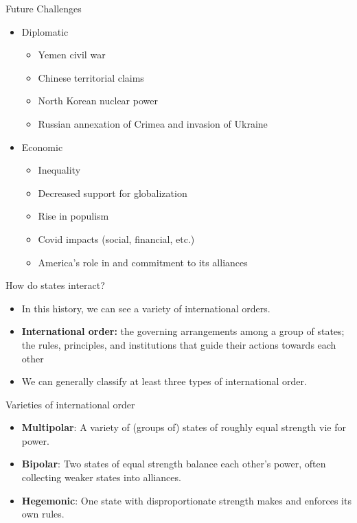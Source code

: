 \documentclass[handout]{beamer}
\begin{document}
\begin{frame}{\LARGE Future Challenges}
	\begin{itemize}
		\item Diplomatic
		\begin{itemize}
			\item Yemen civil war
			\item Chinese territorial claims
			\item North Korean nuclear power
			\item Russian annexation of Crimea and invasion of Ukraine \pause
		\end{itemize}
	\end{itemize}
	\begin{itemize}
		\item Economic
		\begin{itemize}
			\item Inequality
			\item Decreased support for globalization
			\item Rise in populism
			\item Covid impacts (social, financial, etc.)
			\item America's role in and commitment to its alliances			
		\end{itemize}
	\end{itemize}
\end{frame}

\begin{frame}{\LARGE How do states interact?}
\begin{itemize} 
	\item In this history, we can see a variety of international orders. \pause
    \item \textbf{International order:} the governing arrangements among a group of states; the rules, principles, and institutions that guide their actions towards each other \pause
    \item We can generally classify at least three types of international order.
\end{itemize}
\end{frame}

\begin{frame}{\LARGE Varieties of international order}
\begin{itemize}
    \item \textbf{Multipolar}: A variety of (groups of) states of roughly equal strength vie for power. \pause
    \item \textbf{Bipolar}: Two states of equal strength balance each other's power, often collecting weaker states into alliances. \pause
    \item \textbf{Hegemonic}: One state with disproportionate strength makes and enforces its own rules.
    
\end{itemize}
\end{frame}
\end{document}
